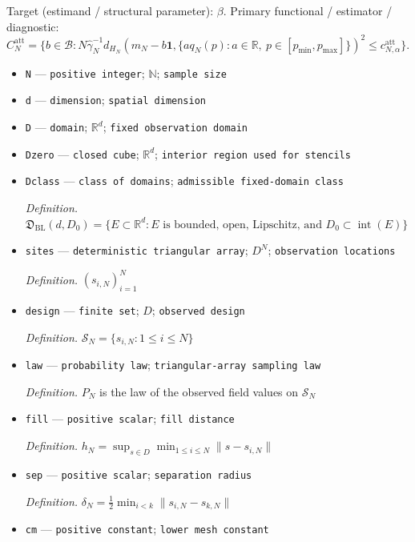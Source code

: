 \documentclass{article}
\begin{document}
Target (estimand / structural parameter): \(\beta\).
Primary functional / estimator / diagnostic: \(C_N^{\mathrm{att}}=\{b\in\mathcal B:N\widehat\gamma_N^{-1}d_{H_N}(m_N-b\mathbf 1,\{a q_N(p):a\in\mathbb R,\ p\in[p_{\min},p_{\max}]\})^2\le c_{N,\alpha}^{\mathrm{att}}\}\).
\begin{itemize}
  \item \texttt{N} --- \texttt{positive integer}; \(\mathbb N\); \texttt{sample size}
  \item \texttt{d} --- \texttt{dimension}; \texttt{spatial dimension}
  \item \texttt{D} --- \texttt{domain}; \(\mathbb R^d\); \texttt{fixed observation domain}
  \item \texttt{Dzero} --- \texttt{closed cube}; \(\mathbb R^d\); \texttt{interior region used for stencils}
  \item \texttt{Dclass} --- \texttt{class of domains}; \texttt{admissible fixed-\allowbreak{}domain class}
  \par\smallskip\noindent\emph{Definition.} \(\mathfrak D_{\mathrm{BL}}(d,D_0)=\{E\subset\mathbb R^d:E\text{ is bounded, open, Lipschitz, and }D_0\subset\operatorname{int}(E)\}\)
  \item \texttt{sites} --- \texttt{deterministic triangular array}; \(D^N\); \texttt{observation locations}
  \par\smallskip\noindent\emph{Definition.} \((s_{i,N})_{i=1}^N\)
  \item \texttt{design} --- \texttt{finite set}; \(D\); \texttt{observed design}
  \par\smallskip\noindent\emph{Definition.} \(\mathcal S_N=\{s_{i,N}:1\le i\le N\}\)
  \item \texttt{law} --- \texttt{probability law}; \texttt{triangular-\allowbreak{}array sampling law}
  \par\smallskip\noindent\emph{Definition.} \(P_N\) is the law of the observed field values on \(\mathcal S_N\)
  \item \texttt{fill} --- \texttt{positive scalar}; \texttt{fill distance}
  \par\smallskip\noindent\emph{Definition.} \(h_N=\sup_{s\in D}\min_{1\le i\le N}\|s-s_{i,N}\|\)
  \item \texttt{sep} --- \texttt{positive scalar}; \texttt{separation radius}
  \par\smallskip\noindent\emph{Definition.} \(\delta_N=\frac12\min_{i<k}\|s_{i,N}-s_{k,N}\|\)
  \item \texttt{cm} --- \texttt{positive constant}; \texttt{lower mesh constant}

\end{itemize}
\end{document}
